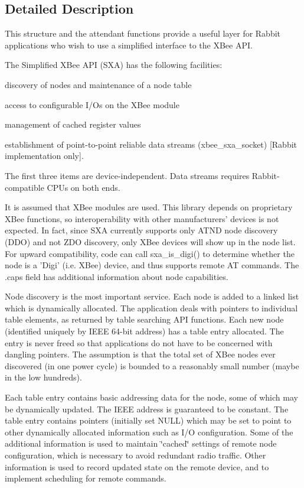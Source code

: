 \subsection{Detailed Description}
This structure and the attendant functions provide a useful layer for Rabbit applications who wish to use a simplified interface to the X\-Bee A\-P\-I. 

The Simplified X\-Bee A\-P\-I (S\-X\-A) has the following facilities\-:
\begin{DoxyItemize}
\item discovery of nodes and maintenance of a node table
\item access to configurable I/\-Os on the X\-Bee module
\item management of cached register values
\item establishment of point-\/to-\/point reliable data streams (xbee\-\_\-sxa\-\_\-socket) \mbox{[}Rabbit implementation only\mbox{]}.
\end{DoxyItemize}

The first three items are device-\/independent. Data streams requires Rabbit-\/compatible C\-P\-Us on both ends.

It is assumed that X\-Bee modules are used. This library depends on proprietary X\-Bee functions, so interoperability with other manufacturers' devices is not expected. In fact, since S\-X\-A currently supports only A\-T\-N\-D node discovery (D\-D\-O) and not Z\-D\-O discovery, only X\-Bee devices will show up in the node list. For upward compatibility, code can call sxa\-\_\-is\-\_\-digi() to determine whether the node is a 'Digi' (i.\-e. X\-Bee) device, and thus supports remote A\-T commands. The .caps field has additional information about node capabilities.

Node discovery is the most important service. Each node is added to a linked list which is dynamically allocated. The application deals with pointers to individual table elements, as returned by table searching A\-P\-I functions. Each new node (identified uniquely by I\-E\-E\-E 64-\/bit address) has a table entry allocated. The entry is never freed so that applications do not have to be concerned with dangling pointers. The assumption is that the total set of X\-Bee nodes ever discovered (in one power cycle) is bounded to a reasonably small number (maybe in the low hundreds).

Each table entry contains basic addressing data for the node, some of which may be dynamically updated. The I\-E\-E\-E address is guaranteed to be constant. The table entry contains pointers (initially set N\-U\-L\-L) which may be set to point to other dynamically allocated information such as I/\-O configuration. Some of the additional information is used to maintain \char`\"{}cached\char`\"{} settings of remote node configuration, which is necessary to avoid redundant radio traffic. Other information is used to record updated state on the remote device, and to implement scheduling for remote commands. 

